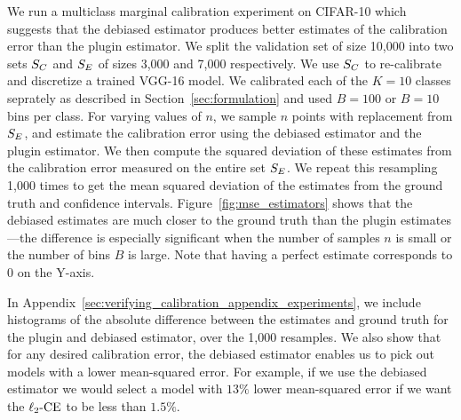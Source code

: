 We run a multiclass marginal calibration experiment on CIFAR-10 which suggests that the debiased estimator produces better estimates of the calibration error than the plugin estimator. We split the validation set of size 10,000 into two sets $S_C{}$ and $S_E{}$ of sizes 3,000 and 7,000 respectively. We use $S_C{}$ to re-calibrate and discretize a trained VGG-16 model. We calibrated each of the $K = 10$ classes seprately as described in Section~\ref{sec:formulation} and used $B = 100$ or $B = 10$ bins per class. For varying values of $n$, we sample $n$ points with replacement from $S_E{}$, and estimate the calibration error using the debiased estimator and the plugin estimator. We then compute the squared deviation of these estimates from the calibration error measured on the entire set $S_E{}$. We repeat this resampling 1,000 times to get the mean squared deviation of the estimates from the ground truth and confidence intervals. Figure~\ref{fig:mse_estimators} shows that the debiased estimates are much closer to the ground truth than the plugin estimates---the difference is especially significant when the number of samples $n$ is small or the number of bins $B$ is large. Note that having a perfect estimate corresponds to $0$ on the Y-axis.

In Appendix~\ref{sec:verifying_calibration_appendix_experiments}, we include histograms of the absolute difference between the estimates and ground truth for the plugin and debiased estimator, over the 1,000 resamples. We also show that for any desired calibration error, the debiased estimator enables us to pick out models with a lower mean-squared error. For example, if we use the debiased estimator we would select a model with $13\%$ lower mean-squared error if we want the $\ell_2\textup{-CE}$ to be less than $1.5\%$.


